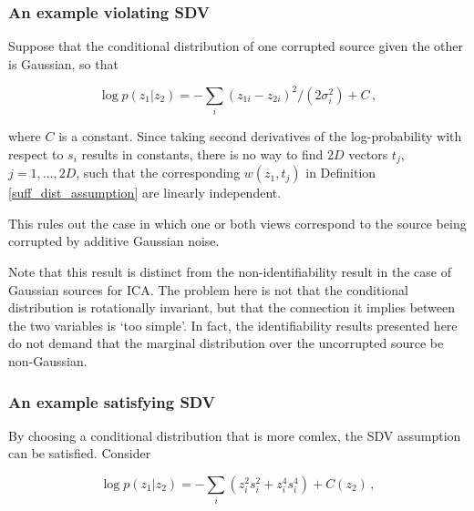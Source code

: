 
\subsubsection{An example violating SDV}

Suppose that the conditional distribution of one corrupted source given the other is Gaussian, so that

\begin{equation}
\log p(z_1|z_2) =  -\sum_i (z_{1i} - z_{2i})^2/(2\sigma_i^2) + C \,, \label{eq:unsatisfied}
\end{equation}

where $C$ is a constant.
Since taking second derivatives of the log-probability with respect to $s_i$ results in constants,
there is no way to find $2D$ vectors ${t}_j$, $j=1, \ldots, 2D$, such that the corresponding ${w}(z_1, t_j)$ in Definition \ref{suff_dist_assumption} are linearly independent.

This rules out the case in which one or both views correspond to the source being corrupted by additive Gaussian noise.

Note that this result is distinct from the non-identifiability result in the case of Gaussian sources for ICA.
The problem here is not that the conditional distribution is rotationally invariant, but that the connection it implies between the two variables is `too simple'.
In fact, the identifiability results presented here do not demand that the marginal distribution over the uncorrupted source be non-Gaussian.



\subsubsection{An example satisfying SDV}

By choosing a conditional distribution  that is more comlex, the SDV assumption can be satisfied. Consider

\begin{equation}
\log p(z_1|z_2) =  - \sum_i (z_i^2  s_i^2 + z_i^4 s_i^4  ) + C(z_2) \,, \label{eq:satisfied}
\end{equation}

